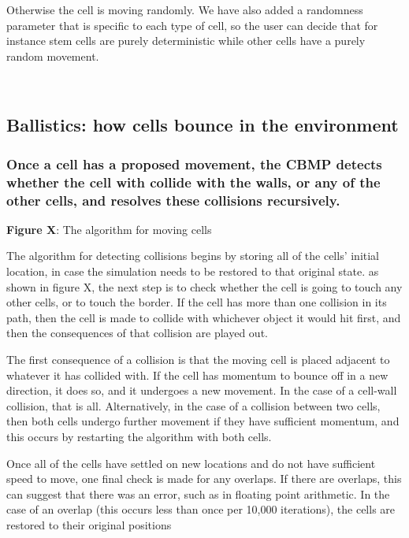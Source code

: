 \documentclass[12pt,a4paper]{report}
\begin{document}
Otherwise the cell is moving randomly. We have also added a randomness 
parameter that is specific to each type of cell, so the user can decide 
that for instance stem cells are purely deterministic while other cells 
have a purely random movement.

\ \ \ \ \ \ \ \ \ \ \ \ \ \ \ \ 

\subsection{Ballistics: how cells bounce in the 
environment}
\subsubsection{{\bfseries Once a cell has a proposed movement, the CBMP 
detects whether the cell with collide with the walls, or any of the 
other cells, and resolves these collisions recursively.}
}




\begin{figure}[H]
\centering
\end{figure}


{\bfseries Figure X}: The algorithm for moving cells



The algorithm for detecting collisions begins by storing all of the 
cells' initial location, in case the simulation needs to be restored to 
that original state. as shown in figure X, the next step is to check 
whether the cell is going to touch any other cells, or to touch the 
border. If the cell has more than one collision in its path, then the 
cell is made to collide with whichever object it would hit first, and 
then the consequences of that collision are played out. 



The first consequence of a collision is that the moving cell is placed 
adjacent to whatever it has collided with. If the cell has momentum to 
bounce off in a new direction, it does so, and it undergoes a new 
movement. In the case of a cell-wall collision, that is all. 
Alternatively, in the case of a collision between two cells, then both 
cells undergo further movement if they have sufficient momentum, and 
this occurs by restarting the algorithm with both cells.



Once all of the cells have settled on new locations and do not have 
sufficient speed to move, one final check is made for any overlaps. If 
there are overlaps, this can suggest that there was an error, such as in 
floating point arithmetic. In the case of an overlap (this occurs less 
than once per 10,000 iterations), the cells are restored to their 
original positions
\end{document}
